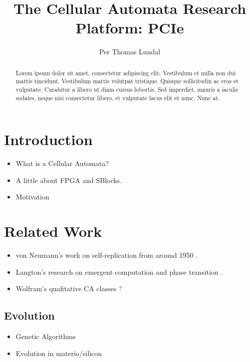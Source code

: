\documentclass[a4paper]{IEEEtran}
\title{The Cellular Automata Research Platform: PCIe}
\author{Per Thomas Lundal}
\begin{document}
\maketitle

\begin{abstract}

Lorem ipsum dolor sit amet, consectetur adipiscing elit. Vestibulum et nulla non dui mattis tincidunt. Vestibulum mattis volutpat tristique. Quisque sollicitudin ac eros et vulputate. Curabitur a libero ut diam cursus lobortis. Sed imperdiet, mauris a iaculis sodales, neque nisi consectetur libero, et vulputate lacus elit et nunc. Nunc at.

\end{abstract}

\section{Introduction}

\begin{itemize}
    \item What is a Cellular Automata?
    \item A little about FPGA and SBlocks.
    \item Motivation
\end{itemize}

\section{Related Work}

\begin{itemize}
    \item von Neumann's work on self-replication from around 1950 \cite{neumann1966selfreplication}.
    \item Langton's research on emergent computation and phase transition \cite{langton1990edgeofchaos}.
    \item Wolfram's quafitative CA classes \cite{wolfram1984complexity}?
\end{itemize}

\subsection{Evolution}

\begin{itemize}
    \item Genetic Algorithms
    \item Evolution in materio/silicon \cite{miller2014evolution}
\end{itemize}
\end{document}
